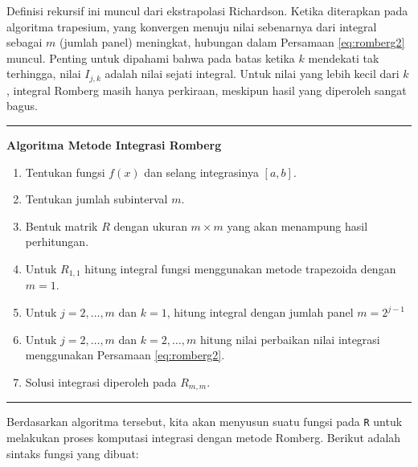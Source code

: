 \documentclass[]{book}
\providecommand{\tightlist}{%
  \setlength{\itemsep}{0pt}\setlength{\parskip}{0pt}}
\theoremstyle{definition}
\theoremstyle{definition}
\theoremstyle{definition}
\theoremstyle{remark}
\begin{document}
Definisi rekursif ini muncul dari ekstrapolasi Richardson. Ketika diterapkan pada algoritma trapesium, yang konvergen menuju nilai sebenarnya dari integral sebagai \(m\) (jumlah panel) meningkat, hubungan dalam Persamaan \eqref{eq:romberg2} muncul. Penting untuk dipahami bahwa pada batas ketika \(k\) mendekati tak terhingga, nilai \(I_{j, k}\) adalah nilai sejati integral. Untuk nilai yang lebih kecil dari \(k\), integral Romberg masih hanya perkiraan, meskipun hasil yang diperoleh sangat bagus.

\begin{center}\rule{0.5\linewidth}{\linethickness}\end{center}

\textbf{Algoritma Metode Integrasi Romberg}

\begin{enumerate}
\def\labelenumi{\arabic{enumi}.}
\tightlist
\item
  Tentukan fungsi \(f\left(x\right)\) dan selang integrasinya \(\left[a,b\right]\).
\item
  Tentukan jumlah subinterval \(m\).
\item
  Bentuk matrik \(R\) dengan ukuran \(m\times m\) yang akan menampung hasil perhitungan.
\item
  Untuk \(R_{1,1}\) hitung integral fungsi menggunakan metode trapezoida dengan \(m=1\).
\item
  Untuk \(j=2,\dots,m\) dan \(k=1\), hitung integral dengan jumlah panel \(m=2^{j-1}\)
\item
  Untuk \(j=2,\dots,m\) dan \(k=2,\dots,m\) hitung nilai perbaikan nilai integrasi menggunakan Persamaan \eqref{eq:romberg2}.
\item
  Solusi integrasi diperoleh pada \(R_{m,m}\).
\end{enumerate}

\begin{center}\rule{0.5\linewidth}{\linethickness}\end{center}

Berdasarkan algoritma tersebut, kita akan menyusun suatu fungsi pada \texttt{R} untuk melakukan proses komputasi integrasi dengan metode Romberg. Berikut adalah sintaks fungsi yang dibuat:
\end{document}
